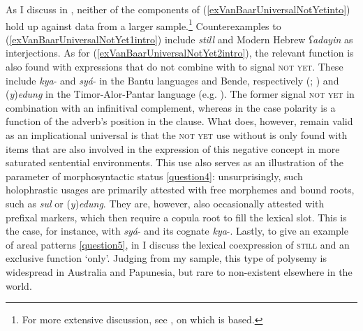 As I discuss in , neither of the components of (\ref{exVanBaarUniversalNotYetinto}) hold up against data from a larger sample.\footnote{For more extensive discussion, see \textcite{PersohnNotYet}, on which  is based.} Counterexamples to (\ref{exVanBaarUniversalNotYet1intro}) include  \textit{still} and Modern Hebrew \textit{ʕadayin} as  interjections.  As for (\ref{exVanBaarUniversalNotYet2intro}), the relevant function is also found with expressions that do not combine with  to signal \textsc{not yet}. These include \mbox{\textit{kya}-} and \mbox{\textit{syá}-} in the Bantu languages  and Bende, respectively (\cite{Abe2015}; \cite{MolochievaEtAl2021}) and \mbox{(\textit{y})\textit{edung}} in the Timor-Alor-Pantar language  (e.g. \cite{Steinhauer1995}). The former signal \textsc{not yet} in combination with an infinitival complement, whereas in the  case polarity is a function of the adverb's position in the clause. What does, however, remain valid as an implicational universal is that the \textsc{not yet} use without  is only found with items that are also involved in the expression of this negative concept in more saturated sentential environments. This use also serves as an illustration of the parameter of morphosyntactic status \ref{question4}: unsurprisingly, such holophrastic usages are primarily attested with free morphemes and bound roots, such as  \textit{sul} or  \mbox{(\textit{y})\textit{edung}}. They are, however, also occasionally attested with prefixal markers, which then require a copula root to fill the lexical slot. This is the case, for instance, with  \mbox{\textit{syá}-} and its  cognate \mbox{\textit{kya}-}. Lastly, to give an example of areal patterns \ref{question5}, in  I discuss the lexical coexpression of \textsc{still} and an exclusive function \lq only'. Judging from my sample, this type of polysemy is widespread in Australia and Papunesia, but rare to non-existent elsewhere in the world.

